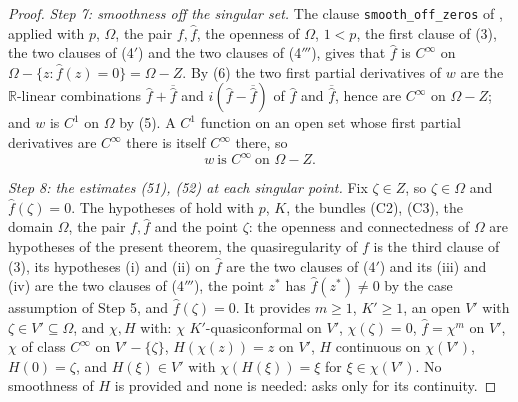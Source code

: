 \begin{proof}
\emph{Step 7: smoothness off the singular set.}  The clause
\texttt{smooth\_off\_zeros} of , applied with $p$,
$\Omega$, the pair $f,\hat f$, the openness of $\Omega$, $1<p$, the first
clause of (3), the two clauses of (4$'$) and the two clauses of (4$'''$), gives
that $\hat f$ is $C^\infty$ on
$\Omega-\{z:\hat f(z)=0\}=\Omega-Z$.  By (6) the two first partial derivatives
of $w$ are the $\mathbb{R}$-linear combinations $\hat f+\overline{\hat f}$ and
$i(\hat f-\overline{\hat f})$ of $\hat f$ and $\overline{\hat f}$, hence are
$C^\infty$ on $\Omega-Z$; and $w$ is $C^{1}$ on $\Omega$ by (5).  A $C^{1}$
function on an open set whose first partial derivatives are $C^\infty$ there is
itself $C^\infty$ there, so
\begin{equation}\tag{9}
  w\ \text{is }C^\infty\ \text{on }\Omega-Z .
\end{equation}

\emph{Step 8: the estimates (51), (52) at each singular point.}  Fix
$\zeta\in Z$, so $\zeta\in\Omega$ and $\hat f(\zeta)=0$.  The hypotheses of
 hold with $p$, $K$, the bundles (C2), (C3),
the domain $\Omega$, the pair $f,\hat f$ and the point $\zeta$: the openness
and connectedness of $\Omega$ are hypotheses of the present theorem, the
quasiregularity of $f$ is the third clause of (3), its hypotheses (i) and (ii)
on $\hat f$ are the two clauses of (4$'$) and its (iii) and (iv) are the two
clauses of (4$'''$), the point $z^{*}$ has $\hat f(z^{*})\neq0$ by the case
assumption of Step 5, and $\hat f(\zeta)=0$.  It provides $m\ge1$, $K'\ge1$, an
open $V'$ with $\zeta\in V'\subseteq\Omega$, and $\chi,H$ with: $\chi$
$K'$-quasiconformal on $V'$, $\chi(\zeta)=0$, $\hat f=\chi^{m}$ on $V'$, $\chi$
of class $C^\infty$ on $V'-\{\zeta\}$, $H(\chi(z))=z$ on $V'$, $H$ continuous
on $\chi(V')$, $H(0)=\zeta$, and $H(\xi)\in V'$ with $\chi(H(\xi))=\xi$ for
$\xi\in\chi(V')$.  No smoothness of $H$ is provided and none is needed:
 asks only for its continuity.


\end{proof}

